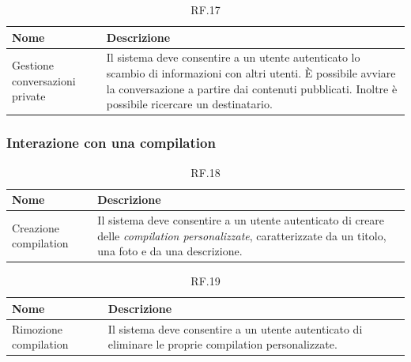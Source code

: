\documentclass{natourDoc}
\begin{document}
\begin{table}[H]
	\centering
	\begin{tabular}{ |p{5cm}|p{10.3cm}| }
		\hline
		\rowcolor{PineGreen!70}
		\textbf{Nome}                  & \textbf{Descrizione}                                                                           \\
		\hline
		Gestione conversazioni private & Il sistema deve consentire a un utente autenticato lo scambio di informazioni con altri utenti.
		È possibile avviare la conversazione a partire dai contenuti pubblicati. Inoltre è possibile ricercare un destinatario.         \\
		\hline
	\end{tabular}
	\caption{RF.17}

\end{table}

\subsubsection{Interazione con una compilation}
\begin{table}[H]
	\centering
	\begin{tabular}{ |p{5cm}|p{10.3cm}| }
		\hline
		\rowcolor{PineGreen!70}
		\textbf{Nome}         & \textbf{Descrizione}                                                                                    \\
		\hline
		Creazione compilation & Il sistema deve consentire a un utente autenticato di creare delle \textit{compilation personalizzate},
		caratterizzate da un titolo, una foto e da una descrizione.                                                                     \\
		\hline
	\end{tabular}
	\caption{RF.18}

\end{table}

\begin{table}[H]
	\centering
	\begin{tabular}{ |p{5cm}|p{10.3cm}| }
		\hline
		\rowcolor{PineGreen!70}
		\textbf{Nome}         & \textbf{Descrizione}                                                       \\
		\hline
		Rimozione compilation & Il sistema deve consentire a un utente autenticato di eliminare le proprie
		compilation personalizzate.                                                                      \\
		\hline
	\end{tabular}
	\caption{RF.19}

\end{table}
\end{document}
